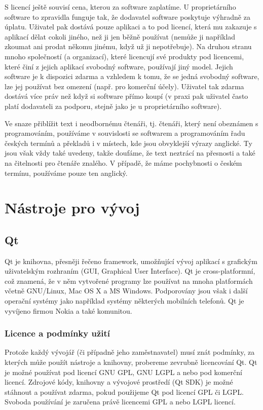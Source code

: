 \documentclass[a4paper,10pt]{article}
\begin{document}
S licencí ještě souvisí cena, kterou za software zaplatíme.
U proprietárního software to zpravidla funguje tak, že dodavatel software poskytuje výhradně za úplatu.
Uživatel pak dostává pouze aplikaci a to pod licencí, která mu zakazuje s aplikací dělat cokoli jiného, než ji jen běžně používat (nemůže ji například zkoumat ani prodat někomu jinému, když už ji nepotřebuje).
Na druhou stranu mnoho společností (a organizací), které licencují své produkty pod licencemi, které činí z jejich aplikací svobodný software, používají jiný model.
Jejich software je k dispozici zdarma a vzhledem k tomu, že se jedná svobodný software, lze jej používat bez omezení (např. pro komerční účely).
Uživatel tak zdarma dostává více práv než když si software přímo koupí (v praxi pak uživatel často platí dodavateli za podporu, stejně jako je u proprietárního software).

Ve snaze přiblížit text i neodbornému čtenáři, tj. čtenáři, který není obeznámen s programováním, používáme v souvislosti se softwarem a programováním řadu českých termínů a překladů i v místech, kde jsou obvyklejší výrazy anglické.
Ty jsou však vždy také uvedeny, takže doufáme, že text neztrácí na přesnosti a také na čitelnosti pro čtenáře znalého.
V případě, že máme pochybnosti o českém termínu, používáme pouze ten anglický.

\section{Nástroje pro vývoj}

\subsection{Qt}
Qt je knihovna, přesněji řečeno framework, umožňující vývoj aplikací s grafickým uživatelským rozhraním (GUI, Graphical User Interface).
Qt je cross-platformní, což znamená, že v něm vytvořené programy lze používat na mnoha platformách včetně GNU/Linux, Mac OS X a MS Windows.
Podporovány jsou však i další operační systémy jako například systémy některých mobilních telefonů.
Qt je vyvíjeno firmou Nokia a také komunitou.

\subsubsection{Licence a podmínky užití}
Protože každý vývojář (či případně jeho zaměstnavatel) musí znát podmínky, za kterých může použít nástroje a knihovny, probereme zevrubně licencování Qt.
Qt je možné používat pod licencí GNU GPL, GNU LGPL a nebo pod komerční licencí.
Zdrojové kódy, knihovny a vývojové prostředí (Qt SDK) je možné stáhnout a používat zdarma, pokud použijeme Qt pod licencí GPL či LGPL.
Svoboda používání je zaručena právě licencemi GPL a nebo LGPL licencí.
\end{document}

